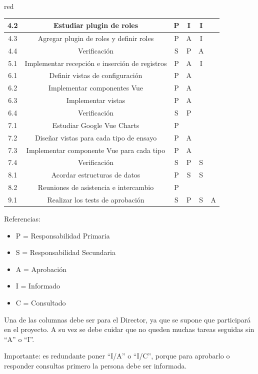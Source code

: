 \documentclass[11pt]{charter}
\begin{document}
\begin{consigna}{red}
\begin{table}[htpb]
{\begin{tabular}{|c|c|c|c|c|c|}
4.2 & Estudiar plugin de roles & P & I & I &  \\ \hline
4.3 & Agregar plugin de roles y definir roles & P & A & I &  \\ \hline
4.4 & Verificación & S & P & A &  \\ \hline
5.1 & Implementar recepción e inserción de registros & P & A & I & \\ \hline
6.1 & Definir vistas de configuración & P & A &  &  \\ \hline
6.2 & Implementar componentes Vue & P & A &  &  \\ \hline
6.3 & Implementar vistas & P & A &  &  \\ \hline
6.4 & Verificación & S & P &  &  \\ \hline
7.1 & Estudiar Google Vue Charts & P &  &  &  \\ \hline
7.2 & Diseñar vistas para cada tipo de ensayo & P & A &  &  \\ \hline
7.3 & Implementar componente Vue para cada tipo & P & A &  &  \\ \hline
7.4 & Verificación & S & P & S &  \\ \hline
8.1 & Acordar estructuras de datos & P & S & S &  \\ \hline
8.2 & Reuniones de asistencia e intercambio & P &  &  &  \\ \hline
9.1 & Realizar los tests de aprobación & S & P & S & A \\ \hline
\end{tabular}%
}
\end{table}

{\footnotesize
Referencias:
\begin{itemize}
	\item P = Responsabilidad Primaria
	\item S = Responsabilidad Secundaria
	\item A = Aprobación
	\item I = Informado
	\item C = Consultado
\end{itemize}
} %

Una de las columnas debe ser para el Director, ya que se supone que participará en el proyecto.
A su vez se debe cuidar que no queden muchas tareas seguidas sin ``A'' o ``I''.

Importante: es redundante poner ``I/A'' o ``I/C'', porque para aprobarlo o responder consultas primero la persona debe ser informada.

\end{consigna}
\end{document}
